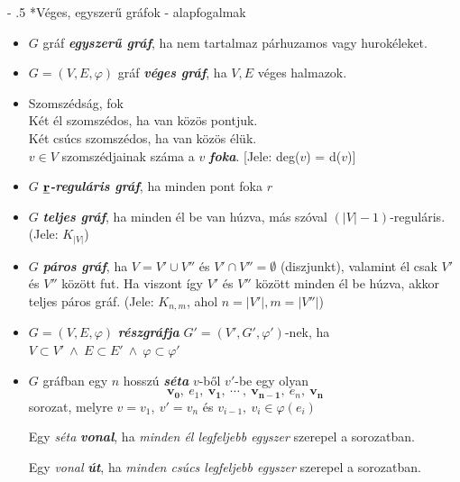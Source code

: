 \documentclass[12pt,margin=0px]{article}
\makeatletter
\renewcommand\paragraph{%
	\@startsection{paragraph}{4}{0mm}%
	{-\baselineskip}%
	{.5\baselineskip}%
	{\normalfont\normalsize\bfseries}}
\makeatother
\begin{document}
        \paragraph*{Véges, egyszerű gráfok - alapfogalmak} \hfill
        \begin{itemize}[leftmargin=5.5mm]
        \renewcommand{\labelitemi}{$\vcenter{\hbox{\tiny$\bullet$}}$}	
            \item $G$ gráf \emph{\textbf{egyszerű gráf}}, ha nem tartalmaz párhuzamos vagy hurokéleket.
            \item $G= (V,E,\varphi)$ gráf \emph{\textbf{véges gráf}}, ha $V,E$ véges halmazok.
            \item Szomszédság, fok\\
            Két él szomszédos, ha van közös pontjuk.\\
            Két csúcs szomszédos, ha van közös élük. \\
            $v\in V$ szomszédjainak száma a $v$ \textbf{\emph{foka}}. [Jele: deg($v$) = d($v$)]
            \item $G$ \emph{\textbf{$\emph{\textbf{r}}$-reguláris gráf}}, ha minden pont foka $r$
            \item $G$ \emph{\textbf{teljes gráf}}, ha minden él be van húzva, más szóval $(\big|V\big|-1)$-reguláris. (Jele: $K_{\big|V|}$)
            \item $G$ \emph{\textbf{páros gráf}}, ha $V = V' \cup V''$ és $V'\cap V'' = \emptyset$ (diszjunkt), valamint él csak $V'$ és $V''$ között fut.
            Ha viszont így $V'$ és $V''$ között minden él be húzva, akkor teljes páros gráf. (Jele: $K_{n,m}$, ahol $n=\big|V'\big|, m=\big|V''\big|$)
            \item $G = (V,E,\varphi)$ \emph{\textbf{részgráfja}} $G'=(V',G',\varphi')$-nek, ha $V\subset V' \ \land \ E \subset E' \ \land \ \varphi \subset \varphi'$
            \item $G$ gráfban egy $n$ hosszú \emph{\textbf{séta}} $v$-ből $v'$-be egy olyan
            \[\boldsymbol{v_0},\ e_1,\ \boldsymbol{v_1}, \ \cdots \ ,\ \boldsymbol{v_{n-1}},\ e_n,\ \boldsymbol{v_n}\]
            sorozat, melyre $v=v_1,\ v'=v_n$ és $v_{i-1},\ v_{i} \in \varphi(e_i)$

            Egy \emph{séta} \emph{\textbf{vonal}}, ha \emph{minden él legfeljebb egyszer} szerepel a sorozatban.

            Egy \emph{vonal} \emph{\textbf{út}}, ha \emph{minden csúcs legfeljebb egyszer} szerepel a sorozatban.


\end{itemize}
\end{document}
